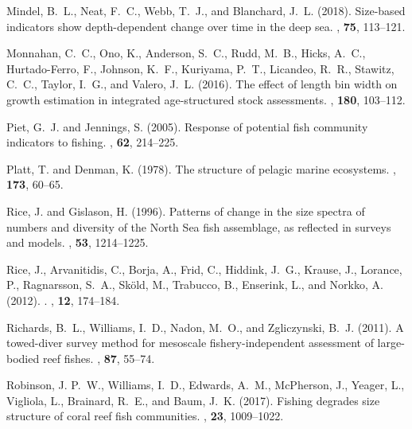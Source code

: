\begin{thebibliography}{}
Mindel, B.~L., Neat, F.~C., Webb, T.~J., and Blanchard, J.~L. (2018).
\newblock Size-based indicators show depth-dependent change over time in the
  deep sea.
, {\bf 75}, 113--121.

Monnahan, C.~C., Ono, K., Anderson, S.~C., Rudd, M.~B., Hicks, A.~C.,
  Hurtado-Ferro, F., Johnson, K.~F., Kuriyama, P.~T., Licandeo, R.~R., Stawitz,
  C.~C., Taylor, I.~G., and Valero, J.~L. (2016).
\newblock The effect of length bin width on growth estimation in integrated
  age-structured stock assessments.
, {\bf 180}, 103--112.

Piet, G.~J. and Jennings, S. (2005).
\newblock Response of potential fish community indicators to fishing.
, {\bf 62}, 214--225.

Platt, T. and Denman, K. (1978).
\newblock The structure of pelagic marine ecosystems.
, {\bf 173},
  60--65.

Rice, J. and Gislason, H. (1996).
\newblock Patterns of change in the size spectra of numbers and diversity of
  the {N}orth {S}ea fish assemblage, as reflected in surveys and models.
, {\bf 53}, 1214--1225.

Rice, J., Arvanitidis, C., Borja, A., Frid, C., Hiddink, J.~G., Krause, J.,
  Lorance, P., Ragnarsson, S.~A., Sk\"old, M., Trabucco, B., Enserink, L., and
  Norkko, A. (2012).
.
, {\bf 12}, 174--184.

Richards, B.~L., Williams, I.~D., Nadon, M.~O., and Zgliczynski, B.~J. (2011).
\newblock A towed-diver survey method for mesoscale fishery-independent
  assessment of large-bodied reef fishes.
, {\bf 87}, 55--74.

Robinson, J. P.~W., Williams, I.~D., Edwards, A.~M., McPherson, J., Yeager, L.,
  Vigliola, L., Brainard, R.~E., and Baum, J.~K. (2017).
\newblock Fishing degrades size structure of coral reef fish communities.
, {\bf 23}, 1009--1022.


\end{thebibliography}
